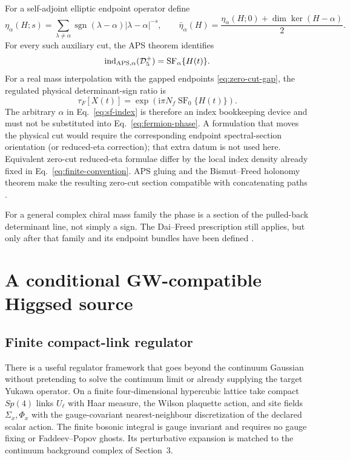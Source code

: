 \documentclass[11pt]{article}
\theoremstyle{definition}
\theoremstyle{remark}
\newcommand{\ii}{\mathrm i}
\newcommand{\cD}{\mathcal D}
\newcommand{\ind}{\operatorname{ind}}
\newcommand{\SF}{\operatorname{SF}}
\begin{document}
For a self-adjoint elliptic endpoint operator define
\begin{equation}
 \eta_\alpha(H;s)=\sum_{\lambda\ne\alpha}
 \operatorname{sgn}(\lambda-\alpha)|\lambda-\alpha|^{-s},
 \qquad
 \bar\eta_\alpha(H)=\frac{\eta_\alpha(H;0)+\dim\ker(H-\alpha)}2.
 \label{eq:reduced-eta}
\end{equation}
For every such auxiliary cut, the APS theorem identifies
\begin{equation}
 \ind_{\rm APS,\alpha}(\cD_5^+)=\SF_\alpha\{H(t)\}.
 \label{eq:sf-index}
\end{equation}
For a real mass interpolation with the gapped endpoints
\eqref{eq:zero-cut-gap}, the regulated physical determinant-sign ratio is
\begin{equation}
 \tau_F[X(t)]
 =\exp\!\left(\ii\pi N_f\SF_0\{H(t)\}\right).
 \label{eq:fermion-phase}
\end{equation}
The arbitrary \(\alpha\) in Eq.~\eqref{eq:sf-index} is therefore an index
bookkeeping device and must not be substituted into
Eq.~\eqref{eq:fermion-phase}.  A formulation that moves the physical cut
would require the corresponding endpoint spectral-section orientation (or
reduced-eta correction); that extra datum is not used here.  Equivalent
zero-cut reduced-eta formulae differ by the local index density already fixed
in Eq.~\eqref{eq:finite-convention}.  APS gluing and the Bismut--Freed
holonomy theorem make the resulting zero-cut section compatible with
concatenating paths
\cite{AtiyahPatodiSinger1975,BismutFreed1986,DaiFreed1994}.

For a general complex chiral mass family the phase is a section of the
pulled-back determinant line, not simply a sign.  The Dai--Freed prescription
still applies, but only after that family and its endpoint bundles have been
defined \cite{Witten2016,WittenYonekura2019}.

\section{A conditional GW-compatible Higgsed source}

\subsection{Finite compact-link regulator}

There is a useful regulator framework that goes beyond the continuum Gaussian
without pretending to solve the continuum limit or already supplying the
target Yukawa operator.  On a finite four-dimensional
hypercubic lattice take compact \(Sp(4)\) links \(U_\ell\) with Haar measure,
the Wilson plaquette action, and site fields \(\Sigma_x,\Phi_x\) with the
gauge-covariant nearest-neighbour discretization of the declared scalar
action.  The finite bosonic integral is gauge invariant and requires no
gauge fixing or Faddeev--Popov ghosts.  Its perturbative expansion is
matched to the continuum background complex of Section~3.
\end{document}
